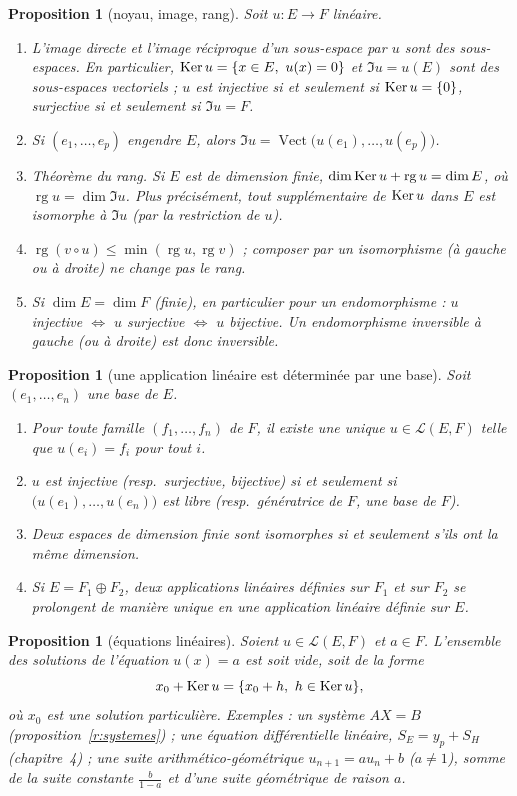 \documentclass[a4paper,11pt]{article}
\numberwithin{equation}{section}
\numberwithin{figure}{section}
\numberwithin{table}{section}
\theoremstyle{enonce}
\newtheorem{proposition}[definition]{Proposition}
\theoremstyle{exemple}
\theoremstyle{remarque}
\newcommand{\rg}{\operatorname{rg}}
\newcommand{\vect}{\operatorname{Vect}}
\begin{document}
\begin{proposition}[noyau, image, rang]\label{p:rang}
Soit $u:E\to F$ linéaire.
\begin{enumerate}
\item L'image directe et l'image réciproque d'un sous-espace par $u$ sont des sous-espaces. En particulier,
$\operatorname{Ker} u=\{x\in E,\ u(x)=0\}$ et $\Im u=u(E)$ sont des sous-espaces vectoriels ; $u$ est injective si et seulement si
$\operatorname{Ker} u=\{0\}$, surjective si et seulement si $\Im u=F$.
\item Si $(e_1,\dots,e_p)$ engendre $E$, alors $\Im u=\vect\big(u(e_1),\dots,u(e_p)\big)$.
\item \emph{Théorème du rang.} Si $E$ est de dimension finie, $\dim\Ker u+\rg u=\dim E$, où $\rg u=\dim\Im u$. Plus précisément,
tout supplémentaire de $\operatorname{Ker} u$ dans $E$ est isomorphe à $\Im u$ (par la restriction de $u$).
\item $\rg(v\circ u)\leq\min(\rg u,\rg v)$ ; composer par un isomorphisme (à gauche ou à droite) ne change pas le rang.
\item Si $\dim E=\dim F$ (finie), en particulier pour un endomorphisme : $u$ injective $\iff$ $u$ surjective $\iff$ $u$ bijective.
Un endomorphisme inversible à gauche (ou à droite) est donc inversible.
\end{enumerate}
\end{proposition}

\begin{proposition}[une application linéaire est déterminée par une base]\label{r:base-image}
Soit $(e_1,\dots,e_n)$ une base de $E$.
\begin{enumerate}
\item Pour toute famille $(f_1,\dots,f_n)$ de $F$, il existe une unique $u\in\mathcal L(E,F)$ telle que $u(e_i)=f_i$ pour tout $i$.
\item $u$ est injective (resp.\ surjective, bijective) si et seulement si $\big(u(e_1),\dots,u(e_n)\big)$ est libre
(resp.\ génératrice de $F$, une base de $F$).
\item Deux espaces de dimension finie sont isomorphes si et seulement s'ils ont la même dimension.
\item Si $E=F_1\oplus F_2$, deux applications linéaires définies sur $F_1$ et sur $F_2$ se prolongent de manière unique en une
application linéaire définie sur $E$.
\end{enumerate}
\end{proposition}

\begin{proposition}[équations linéaires]\label{r:equations}
Soient $u\in\mathcal L(E,F)$ et $a\in F$. L'ensemble des solutions de l'équation $u(x)=a$ est soit vide, soit de la forme
\[x_0+\operatorname{Ker} u=\{x_0+h,\ h\in\operatorname{Ker} u\},\]
où $x_0$ est une solution particulière. Exemples : un système $AX=B$ (proposition~\ref{r:systemes}) ; une équation
différentielle linéaire, $S_E=y_p+S_H$ (chapitre~4) ; une suite arithmético-géométrique $u_{n+1}=au_n+b$ ($a\neq1$), somme de la
suite constante $\frac b{1-a}$ et d'une suite géométrique de raison $a$.
\end{proposition}
\end{document}
